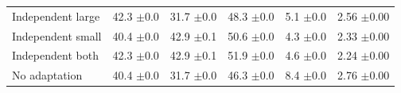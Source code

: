 \begin{table}[t]
\begin{tabular}{lccccc}
        \midrule
        Independent large & 42.3 {\scriptsize$\pm$0.0} & 31.7 {\scriptsize$\pm$0.0} & 48.3 {\scriptsize$\pm$0.0} & 5.1 {\scriptsize$\pm$0.0} & 2.56 {\scriptsize$\pm$0.00} \\
        Independent small & 40.4 {\scriptsize$\pm$0.0} & 42.9 {\scriptsize$\pm$0.1} & 50.6 {\scriptsize$\pm$0.0} & 4.3 {\scriptsize$\pm$0.0} & 2.33 {\scriptsize$\pm$0.00} \\
        Independent both & 42.3 {\scriptsize$\pm$0.0} & 42.9 {\scriptsize$\pm$0.1} & 51.9 {\scriptsize$\pm$0.0} & 4.6 {\scriptsize$\pm$0.0} & 2.24 {\scriptsize$\pm$0.00} \\
        \midrule
        No adaptation & 40.4 {\scriptsize$\pm$0.0} & 31.7 {\scriptsize$\pm$0.0} & 46.3 {\scriptsize$\pm$0.0} & 8.4 {\scriptsize$\pm$0.0} & 2.76 {\scriptsize$\pm$0.00} \\
        \bottomrule
    \end{tabular}
\end{table}
